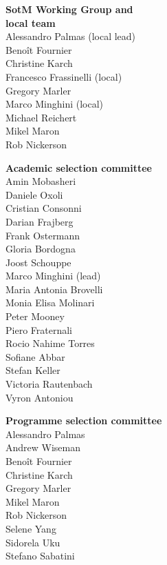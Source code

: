 \newlength{\volunteerSpace}
\setlength{}
\RaggedRight
\begin{multicols}{2}
  \begin{small}
    \textbf{SotM Working Group and\\ local team}\\
    Alessandro Palmas (local lead)\\
    Benoît Fournier\\
    Christine Karch\\
    Francesco Frassinelli (local)\\
    Gregory Marler\\
    Marco Minghini (local)\\
    Michael Reichert\\
    Mikel Maron\\
    Rob Nickerson

    \vspace{\volunteerSpace}
    \textbf{Academic selection committee}\\
    Amin Mobasheri\\
    Daniele Oxoli\\
    Cristian Consonni\\
    Darian Frajberg\\
    Frank Ostermann\\
    Gloria Bordogna\\
    Joost Schouppe\\
    Marco Minghini (lead)\\
    Maria Antonia Brovelli\\
    Monia Elisa Molinari\\
    Peter Mooney\\
    Piero Fraternali\\
    Rocio Nahime Torres\\
    Sofiane Abbar\\
    Stefan Keller\\
    Victoria Rautenbach\\
    Vyron Antoniou

    \vspace{\volunteerSpace}
    \textbf{Programme selection \mbox{committee}}\\
    Alessandro Palmas\\
    Andrew Wiseman\\
    Benoît Fournier\\
    Christine Karch\\
    Gregory Marler\\
    Mikel Maron\\
    Rob Nickerson\\
    Selene Yang\\
    Sidorela Uku\\
    Stefano Sabatini\\


\end{small}
\end{multicols}

